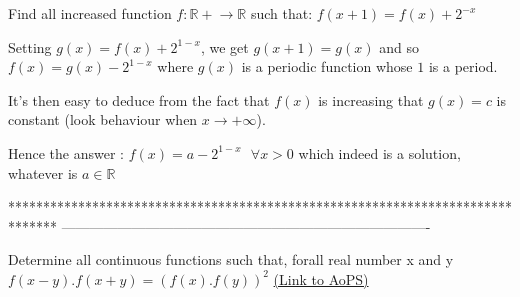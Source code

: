 \begin{solution}
	\begin{tcolorbox}Find all increased function $f: \mathbb{R+} \rightarrow \mathbb{R}$ such that:
$f(x+1) = f(x) + 2^{-x}$\end{tcolorbox}
Setting $g(x)=f(x)+2^{1-x}$, we get $g(x+1)=g(x)$ and so $f(x)=g(x)-2^{1-x}$ where $g(x)$ is a periodic function whose $1$ is a period.

It's then easy to deduce from the fact that $f(x)$ is increasing that $g(x)=c$ is constant (look behaviour when $x\to+\infty$).

Hence the answer : $\boxed{f(x)=a-2^{1-x}\text{  }\forall x>0}$ which indeed is a solution, whatever is $a\in\mathbb R$
\end{solution}
*******************************************************************************
-------------------------------------------------------------------------------

\begin{problem}
	Determine all continuous functions such that, forall real number x and y
$f(x-y).f(x+y)=(f(x).f(y))^2$
	\flushright \href{https://artofproblemsolving.com/community/c6h590213}{(Link to AoPS)}
\end{problem}



